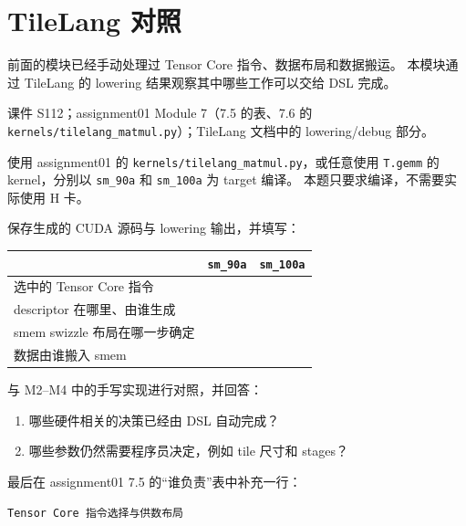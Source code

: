 \documentclass[11pt,a4paper,fontset=fandol]{ctexart}
\begin{document}
\section{TileLang 对照}\label{tilelang-ux5bf9ux7167}

前面的模块已经手动处理过 Tensor Core 指令、数据布局和数据搬运。
本模块通过 TileLang 的 lowering 结果观察其中哪些工作可以交给 DSL 完成。

\begin{reading}

课件 S112；assignment01 Module 7（7.5 的表、7.6 的
\texttt{kernels/\allowbreak{}tilelang\_\allowbreak{}matmul.\allowbreak{}py}）；TileLang
文档中的 lowering/debug 部分。

\end{reading}


使用 assignment01 的
\texttt{kernels/\allowbreak{}tilelang\_\allowbreak{}matmul.\allowbreak{}py}，或任意使用
\texttt{T.\allowbreak{}gemm} 的 kernel，分别以
\texttt{sm\_\allowbreak{}90a} 和 \texttt{sm\_\allowbreak{}100a} 为
target 编译。 本题只要求编译，不需要实际使用 H 卡。

保存生成的 CUDA 源码与 lowering 输出，并填写：

\begin{longtable}[]{@{}lll@{}}
\toprule\noalign{}
& \texttt{sm\_\allowbreak{}90a} & \texttt{sm\_\allowbreak{}100a} \\
\midrule\noalign{}
\endhead
\bottomrule\noalign{}
\endlastfoot
选中的 Tensor Core 指令 & & \\
descriptor 在哪里、由谁生成 & & \\
smem swizzle 布局在哪一步确定 & & \\
数据由谁搬入 smem & & \\
\end{longtable}

与 M2--M4 中的手写实现进行对照，并回答：

\begin{enumerate}
\def\labelenumi{(\alph{enumi})}
\item
  哪些硬件相关的决策已经由 DSL 自动完成？
\item
  哪些参数仍然需要程序员决定，例如 tile 尺寸和 stages？
\end{enumerate}

最后在 assignment01 7.5 的``谁负责''表中补充一行：

\texttt{Tensor\ Core\ 指令选择与供数布局}
\end{document}
